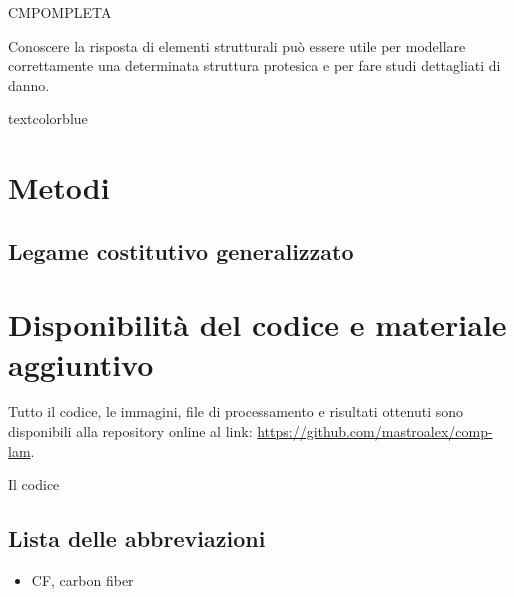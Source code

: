 \documentclass[a4paper,num-refs]{oup-contemporary}
\begin{document}
CMPOMPLETA

Conoscere la risposta di elementi strutturali può essere utile per modellare correttamente una determinata struttura protesica e per fare studi dettagliati  di danno.

textcolor{blue}{\lipsum[1-2]}
\section{Metodi}

\subsection{Legame costitutivo generalizzato}

\textcolor{blue}{\lipsum[1-2]}


\section{Disponibilità del codice e materiale aggiuntivo}

Tutto il codice, le immagini, file di processamento e risultati ottenuti sono disponibili alla repository online al link: \url{https://github.com/mastroalex/comp-lam}. 

Il codice 


\subsection{Lista delle abbreviazioni}

\begin{itemize}
	\item CF, carbon fiber
\end{itemize}
 



\newpage

\end{document}
